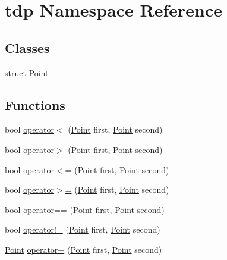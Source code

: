 \hypertarget{namespacetdp}{}\section{tdp Namespace Reference}
\label{namespacetdp}
\subsection*{Classes}
\begin{DoxyCompactItemize}
\item 
struct \mbox{\hyperlink{structtdp_1_1_point}{Point}}
\end{DoxyCompactItemize}
\subsection*{Functions}
\begin{DoxyCompactItemize}
\item 
bool \mbox{\hyperlink{namespacetdp_aa76700935906dbb491a443a4662d758f}{operator$<$}} (\mbox{\hyperlink{structtdp_1_1_point}{Point}} first, \mbox{\hyperlink{structtdp_1_1_point}{Point}} second)
\item 
bool \mbox{\hyperlink{namespacetdp_a948b73cf0c6d99e08e145094d83d8e97}{operator$>$}} (\mbox{\hyperlink{structtdp_1_1_point}{Point}} first, \mbox{\hyperlink{structtdp_1_1_point}{Point}} second)
\item 
bool \mbox{\hyperlink{namespacetdp_a3d677102635fab3ad0088b88378e5b48}{operator$<$=}} (\mbox{\hyperlink{structtdp_1_1_point}{Point}} first, \mbox{\hyperlink{structtdp_1_1_point}{Point}} second)
\item 
bool \mbox{\hyperlink{namespacetdp_a88169ae92b50b53e80d23d8df9d263d1}{operator$>$=}} (\mbox{\hyperlink{structtdp_1_1_point}{Point}} first, \mbox{\hyperlink{structtdp_1_1_point}{Point}} second)
\item 
bool \mbox{\hyperlink{namespacetdp_ac28871640d9ee5c6f37f75be07b6d187}{operator==}} (\mbox{\hyperlink{structtdp_1_1_point}{Point}} first, \mbox{\hyperlink{structtdp_1_1_point}{Point}} second)
\item 
bool \mbox{\hyperlink{namespacetdp_ab1602cb8c233d6ab4a5fa0e12dd219f1}{operator!=}} (\mbox{\hyperlink{structtdp_1_1_point}{Point}} first, \mbox{\hyperlink{structtdp_1_1_point}{Point}} second)
\item 
\mbox{\hyperlink{structtdp_1_1_point}{Point}} \mbox{\hyperlink{namespacetdp_a34cf3e1ef508e6a115b6c1d24a5dbb5d}{operator+}} (\mbox{\hyperlink{structtdp_1_1_point}{Point}} first, \mbox{\hyperlink{structtdp_1_1_point}{Point}} second)

\end{DoxyCompactItemize}
